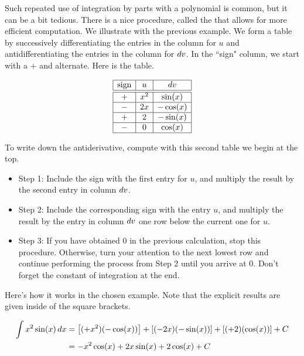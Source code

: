 \documentclass[noauthor]{ximera}
\begin{document}
\begin{remark}
Such repeated use of integration by parts with a polynomial is common, but 
it can be a bit tedious. There is a nice procedure, called the  that allows for more efficient computation.  We illustrate with the 
previous example.  We form a table by successively differentiating the entries 
in the column for $u$ and antidifferentiating the entries in the column for $\mathop{}\!d v$.  
In the ``sign" column, we start with a $+$ and alternate.  Here is the table.

\[
\begin{array}{|c|c|c|}\hline
\text{sign} & u & \mathop{}\!d v \\ \hline \hline
+ & x^2 & \sin(x) \\ \hline
- & 2x & -\cos(x) \\ \hline
 + & 2  & -\sin(x) \\ \hline
- & 0  & \cos(x) \\ \hline
\end{array}
\]

To write down the antiderivative, compute with this second table we begin at the top. 

\begin{itemize}
\item Step 1: Include the sign with the first entry for $u$, and multiply the result by the second entry in column $\mathop{}\!d v$.  
\item Step 2: Include the corresponding sign with the entry $u$, and multiply the result by the entry in column $\mathop{}\!d v$ one row below the current one for $u$.  
\item Step 3: If you have obtained 0 in the previous calculation, stop this procedure. Otherwise, turn your attention to the next lowest row and continue performing the process from Step 2 until you arrive at 0.  Don't forget the constant of integration at the end.
\end{itemize}

Here's how it works in the chosen example.  Note that the explicit results are given inside of the square brackets.

\begin{align*}
\int x^2 \sin(x) \mathop{}\!d x &= \left[(+x^2)(-\cos(x))\right] + \left[(-2x)(-\sin(x)) \right] +\left[(+2)(\cos(x))\right] + C\\
&= -x^2 \cos(x) +2x\sin(x)+2\cos(x) +C
\end{align*}

\end{remark}
\end{document}
